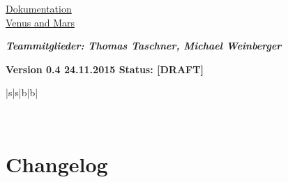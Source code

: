 \documentclass[12pt,a4paper,oneside,ngerman]{scrartcl}
\begin{document}
\thispagestyle{empty}
\vspace*{2cm}


\begin{center}
\begin{huge}
\renewcommand{\ULthickness}{2pt}
\uline{Dokumentation}
\\
\uline{Venus and Mars}
\end{huge}
\end{center}

\vspace{9cm}

\textit{\textbf{Teammitglieder: Thomas Taschner, Michael Weinberger}}
\vspace{10mm}

\textbf{{\color{g4}Version 0.4 \hfill 24.11.2015 \hfill Status: [DRAFT]}}
\\
\begin{table}[h]
\renewcommand{\arraystretch}{3.0}
\centering
\begin{tabularx}{\textwidth}{|s|s|b|b|}

\specialrule{0.07em}{0em}{0em}
 \\ \hline
\end{tabularx}
\end{table}
\newpage


\pagestyle{fancy}
\renewcommand{\headrulewidth}{0.4pt}
\renewcommand{\footrulewidth}{0.4pt}
\setlength\headheight{15pt}
\cfoot{}


\tableofcontents\thispagestyle{fancy}
\newpage


\section{Changelog}
\end{document}
